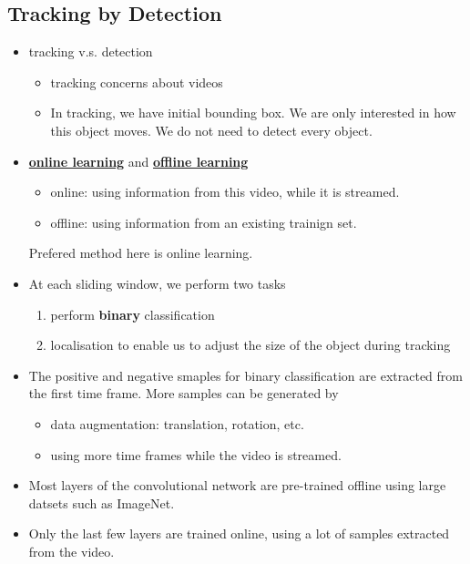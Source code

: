 \documentclass[twocolumn,landscape,10pt]{article}
\theoremstyle{definition}
\begin{document}
\subsection{Tracking by Detection}

\begin{itemize}
    \item tracking v.s. detection
        \begin{itemize}
            \item tracking concerns about videos
            \item In tracking, we have initial bounding box. We are only
                interested in how this object moves. We do not need to detect
                every object.
        \end{itemize} 
    \item \underline{\textbf{online learning}} and \underline{\textbf{offline learning}}
        \begin{itemize}
            \item online: using information from
                this video, while it is streamed.
            \item offline: using information from
                an existing trainign set.
        \end{itemize} 
        Prefered method here is online learning.
    \item At each sliding window, we perform two tasks 
        \begin{enumerate}
            \item perform \textbf{binary} classification
            \item localisation to enable us to adjust the size of the object
                during tracking
        \end{enumerate} 
    \item The positive and negative smaples for binary classification are
        extracted from the first time frame. More samples can be generated by
        \begin{itemize}
            \item data augmentation: translation, rotation, etc.
            \item using more time frames while the video is streamed.
        \end{itemize} 
    \item Most layers of the convolutional network are pre-trained offline using
        large datsets such as ImageNet.
    \item Only the last few layers are trained online, using a lot of samples
        extracted from the video.
\end{itemize} 
\end{document}
